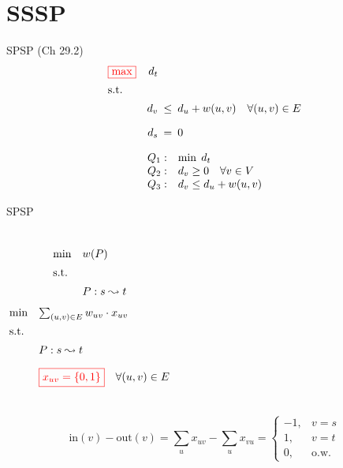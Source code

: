 \section{SSSP}

\begin{frame}{SPSP (Ch 29.2)}
  \begin{equation*}
	\setlength\arraycolsep{2.5pt}
	\begin{array}{l@{\quad}rcl}
	  \color{red}{\boxed{\max}} 	& d_t	& &	\\[5pt]
	  \text{s.t.} 	& &	\\[5pt]
			& d_v   &\leq& d_u + w(u,v) \quad \forall (u,v) \in E	\\[10pt]
			& d_s	&=& 0 
	\end{array}
  \end{equation*}

  \vspace{0.60cm}

  \begin{equation*}
	\setlength\arraycolsep{2.5pt}
	\begin{array}{l@{\quad}l}
	  Q_{1}:	& \min \; d_t	\\
	  Q_{2}:	& d_v \geq 0 \quad \forall v \in V \\
	  Q_{3}:	& d_v \leq d_u + w(u,v)
	\end{array}
  \end{equation*}
\end{frame}
\begin{frame}{SPSP}
  \begin{columns}
	  \begin{equation*}
		\setlength\arraycolsep{2.5pt}
		\begin{array}{l@{\quad}l}
		  \min	& w(P)		\\[5pt]
		  \text{s.t.} 		\\[5pt]
		  & P: s \leadsto t
		\end{array}
	  \end{equation*}
	  \begin{equation*}
		\setlength\arraycolsep{2.5pt}
		\begin{array}{l@{\quad}l}
		  \min	& \sum_{(u,v) \in E} w_{uv} \cdot x_{uv}		\\[5pt]
		  \text{s.t.} 		\\[5pt]
		  & P: s \leadsto t	\\[10pt]
		  &	\red{\boxed{x_{uv} = \set{0,1}}}	\quad \forall (u,v) \in E
		\end{array}
	  \end{equation*}
  \end{columns}

  \vspace{0.80cm}

  \[
	 \text{in}(v) - \text{out}(v) 
	 =	\sum_{u} x_{uv} - \sum_{u} x_{vu} 
	 = \left\{\begin{array}{rl}
	  -1,	&	v = s	\\
	  1,	&	v = t	\\
	  0,	&	\text{o.w.}
	\end{array}\right.
  \]
\end{frame}
